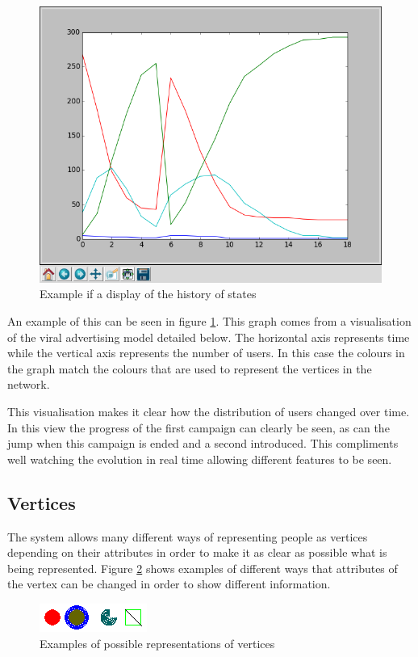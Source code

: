 \documentclass[12pt,a4paper]{article}
\begin{document}
\begin{figure}[htb]
\caption{Example if a display of the history of states}
\label{fig:history}
\centering
\includegraphics[scale=0.3]{Graph.png}
\end{figure}

An example of this can be seen in figure \ref{fig:history}. This graph comes from a visualisation of the viral advertising model detailed below. The horizontal axis represents time while the vertical axis represents the number of users. In this case the colours in the graph match the colours that are used to represent the vertices in the network.

This visualisation makes it clear how the distribution of users changed over time. In this view the progress of the first campaign can clearly be seen, as can the jump when this campaign is ended and a second introduced. This compliments well watching the evolution in real time allowing different features to be seen.

\subsection{Vertices}
\noindent
The system allows many different ways of representing people as vertices depending on their attributes in order to make it as clear as possible what is being represented. Figure \ref{fig:vertices} shows examples of different ways that attributes of the vertex can be changed in order to show different information.

\begin{figure}[htb]
\caption{Examples of possible representations of vertices}
\label{fig:vertices}
\centering
\includegraphics[scale=0.7]{Nodes.png}
\end{figure}
\end{document}
